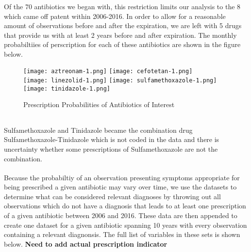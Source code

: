 \documentclass[11pt]{SelfArxOneColBMN}
\begin{document}
Of the 70 antibiotics we began with, this restriction limits our analysis to the 8 which came off patent within 2006-2016. In order to allow for a reasonable amount of observations before and after the expiration, we are left with 5 drugs that provide us with at least 2 years before and after expiration. The monthly probabiltiies of perscription for each of these antibiotics are shown in the figure below.\\
\begin{figure}[h]
\caption{Prescription Probabilities of Antibiotics of Interest}
\centering
\texttt{[image: aztreonam-1.png]}
\texttt{[image: cefotetan-1.png]}\\
\texttt{[image: linezolid-1.png]}
\texttt{[image: sulfamethoxazole-1.png]}\\
\texttt{[image: tinidazole-1.png]}\\
\end{figure}
\\Sulfamethoxazole and Tinidazole became the combination drug Sulfamethoxazole-Tinidazole which is not coded in the data and there is uncertainty whether some prescriptions of Sulfamethoxazole are not the combination.\\
\\
Because the probabiltiy of an observation presenting symptoms appropriate for being prescribed a given antibiotic may vary over time, we use the datasets to determine what can be considered relevant diagnoses by throwing out all observations which do not have a diagnosis that leads to at least one prescription of a given antibiotic between 2006 and 2016. These data are then appended to create one dataset for a given antibiotic spanning 10 years with every observation containing a relevant diagnonsis. The full list of variables in these sets is shown below. \textbf{Need to add actual prescription indicator}
\end{document}
